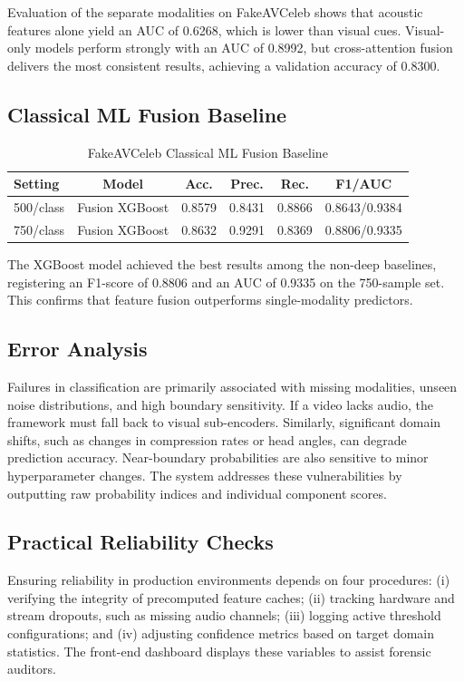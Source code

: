 \documentclass[conference]{IEEEtran}
\begin{document}
Evaluation of the separate modalities on FakeAVCeleb shows that acoustic features alone yield an AUC of 0.6268, which is lower than visual cues. Visual-only models perform strongly with an AUC of 0.8992, but cross-attention fusion delivers the most consistent results, achieving a validation accuracy of 0.8300.

\subsection{Classical ML Fusion Baseline}
\begin{table}[htbp]
\caption{FakeAVCeleb Classical ML Fusion Baseline}
\centering
\begin{tabular}{lccccc}
\toprule
Setting & Model & Acc. & Prec. & Rec. & F1/AUC \\
\midrule
500/class & Fusion XGBoost & 0.8579 & 0.8431 & 0.8866 & 0.8643/0.9384 \\
750/class & Fusion XGBoost & 0.8632 & 0.9291 & 0.8369 & 0.8806/0.9335 \\
\bottomrule
\end{tabular}
\end{table}

The XGBoost model achieved the best results among the non-deep baselines, registering an F1-score of 0.8806 and an AUC of 0.9335 on the 750-sample set. This confirms that feature fusion outperforms single-modality predictors.

\subsection{Error Analysis}
Failures in classification are primarily associated with missing modalities, unseen noise distributions, and high boundary sensitivity. If a video lacks audio, the framework must fall back to visual sub-encoders. Similarly, significant domain shifts, such as changes in compression rates or head angles, can degrade prediction accuracy. Near-boundary probabilities are also sensitive to minor hyperparameter changes. The system addresses these vulnerabilities by outputting raw probability indices and individual component scores.

\subsection{Practical Reliability Checks}
Ensuring reliability in production environments depends on four procedures: (i) verifying the integrity of precomputed feature caches; (ii) tracking hardware and stream dropouts, such as missing audio channels; (iii) logging active threshold configurations; and (iv) adjusting confidence metrics based on target domain statistics. The front-end dashboard displays these variables to assist forensic auditors.
\end{document}
